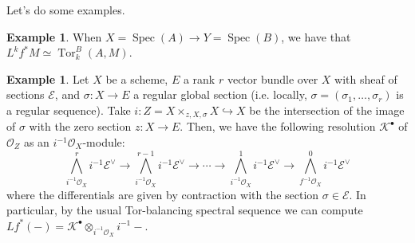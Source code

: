 \documentclass[10pt]{article}
\theoremstyle{definition}
\newtheorem{exmp}[thm]{Example}
\DeclareMathOperator{\Spec}{Spec}
\DeclareMathOperator{\Tor}{Tor}
\newcommand{\OO}{\mathcal{O}}
\newcommand{\todo}[1]{\textbf{\textcolor{red}{TODO #1}}}
\begin{document}
Let's do some examples.
\begin{exmp}
When $X  = \Spec(A) \rightarrow Y = \Spec(B)$, we have that $L^k f^* M \simeq \Tor_k^B(A, M)$.
\end{exmp}

\begin{exmp}
Let $X$ be a scheme, $E$ a rank $r$ vector bundle over $X$ with sheaf of sections $\mathcal{E}$, and $\sigma: X \rightarrow E$ a regular global section (i.e. locally, $\sigma = (\sigma_1,\ldots, \sigma_r)$ is a regular sequence).  Take $i: Z = X \times_{z, X, \sigma} X \hookrightarrow X$ be the intersection of the image of $\sigma$ with the zero section $z: X \rightarrow E$.  Then, we have the following resolution $\mathcal{K}^\bullet$ of $\OO_Z$ as an $i^{-1} \OO_X$-module:
$$\bigwedge^r_{i^{-1}\OO_X} i^{-1} \mathcal{E}^\vee \rightarrow \bigwedge^{r-1}_{i^{-1}\OO_X} i^{-1} \mathcal{E}^\vee \rightarrow \cdots \rightarrow \bigwedge^1_{i^{-1}\OO_X} i^{-1} \mathcal{E}^\vee \rightarrow \bigwedge^0_{f^{-1}\OO_X} i^{-1} \mathcal{E}^\vee$$
where the differentials are given by contraction with the section $\sigma \in \mathcal{E}$.  In particular, by the usual Tor-balancing spectral sequence we can compute $Lf^*(-) = \mathcal{K}^\bullet \otimes_{i^{-1} \OO_X} i^{-1} -$.
\end{exmp}





\end{document}
